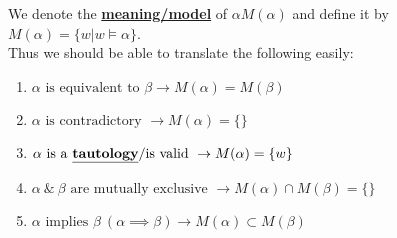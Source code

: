 \documentclass[../../lecture_notes.tex]{subfiles}
\begin{document}
\noindent We denote the \textbf{\underline{meaning/model}} of $\alpha M(\alpha)$ 
	and define it by $M(\alpha) = \{w | w \models \alpha\}$.\\
Thus we should be able to translate the following easily:
\begin{enumerate} [itemsep=0mm]
	\item $\alpha \text{ is equivalent to } \beta \rightarrow M(\alpha) = M(\beta)$
	\item $\alpha \text{ is contradictory } \rightarrow M(\alpha) = \{\}$
	\item $\alpha \text{ is a \textbf{\underline{tautology}}/is valid } \rightarrow M(\alpha) = \{w\}$
	\item $\alpha \ \&\  \beta \text{ are mutually exclusive } \rightarrow M(\alpha) \cap M(\beta) = \{\}$
	\item $\alpha \text{ implies } \beta \  (\alpha \implies \beta) \rightarrow M(\alpha) \subset M(\beta)$
\end{enumerate}
\end{document}
